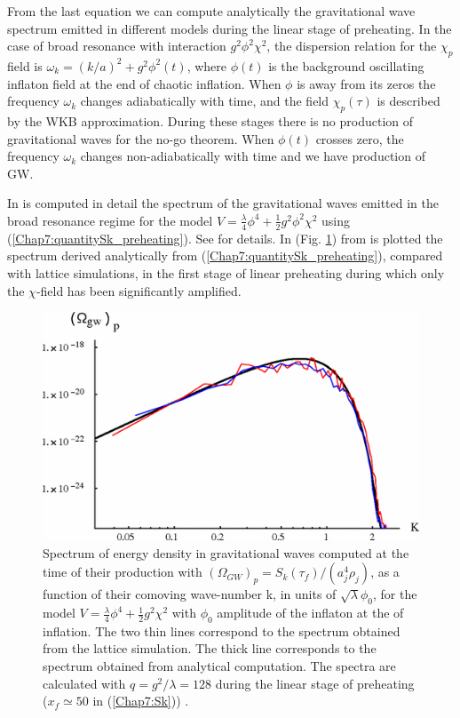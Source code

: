 \documentclass[11pt,a4paper,twoside]{book}
\begin{document}
From the last equation we can compute analytically the gravitational wave spectrum emitted in different models during the linear stage of preheating. In the case of broad resonance with interaction $ g^{2}\phi^{2}\chi^{2} $, the dispersion relation for the $\chi_{p}$ field is $ \omega_{k}=(k/a)^{2}+g^{2}\phi^{2}(t) $, where $\phi(t)$ is the background oscillating inflaton field at the end of chaotic inflation. When $\phi$ is away from its zeros the frequency $\omega_{k}$ changes adiabatically with time, and the field $\chi_{p}(\tau)$ is described by the WKB approximation. During these stages there is no production of gravitational waves for the no-go theorem. When $\phi(t)$ crosses zero, the frequency $\omega_{k}$ changes non-adiabatically with time and we have production of GW.

In \cite{Chap7:GreenMethod} is computed in detail the spectrum of the gravitational waves  emitted in the broad resonance regime for the model $ V=\frac{\lambda}{4}\phi^{4} + \frac{1}{2}g^{2}\phi^{2}\chi^{2} $ using (\ref{Chap7:quantitySk_preheating}). See \cite{Chap7:GreenMethod} for details. In (Fig. \ref{fig:greenmethodfig10}) from \cite{Chap7:GreenMethod} is plotted the spectrum derived analytically from (\ref{Chap7:quantitySk_preheating}), compared with lattice simulations, in the first stage of linear preheating during which only the $\chi$-field has been significantly amplified.
\begin{figure}
	\centering
	\includegraphics[width=0.65\linewidth, height=0.3\textheight]{Images/Chap7/GreenMethod_Fig10}
	\caption{Spectrum of energy density in gravitational waves computed at the time of their production with $(\Omega_{GW})_{p}= S_{k}(\tau_{f})/(a^{4}_{j}\rho_{j}) $, as a function of their comoving wave-number k, in units of $ \sqrt{\lambda} \phi_{0} $, for the model $ V=\frac{\lambda}{4}\phi^{4} + \frac{1}{2}g^{2}\chi^{2} $ with $\phi_{0}$  amplitude of the inflaton at the of inflation. The two thin lines correspond to the spectrum obtained from the lattice simulation. The thick line corresponds to the spectrum obtained from analytical computation. The spectra are calculated with $ q=g^{2}/\lambda=128 $ during the linear stage of preheating ($ x_{f}\simeq 50 $ in (\ref{Chap7:Sk})) \cite{Chap7:GreenMethod}.}
	\label{fig:greenmethodfig10}
\end{figure}
\end{document}
